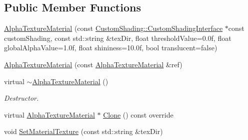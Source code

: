 \subsection*{Public Member Functions}
\begin{DoxyCompactItemize}
\item 
\mbox{\hyperlink{class_geometry_engine_1_1_geometry_material_1_1_alpha_texture_material_a13e251b89fd08e38647572695196c5b6}{Alpha\+Texture\+Material}} (const \mbox{\hyperlink{class_geometry_engine_1_1_custom_shading_1_1_custom_shading_interface}{Custom\+Shading\+::\+Custom\+Shading\+Interface}} $\ast$const custom\+Shading, const std\+::string \&tex\+Dir, float threshold\+Value=0.\+0f, float global\+Alpha\+Value=1.\+0f, float shininess=10.\+0f, bool translucent=false)
\item 
\mbox{\hyperlink{class_geometry_engine_1_1_geometry_material_1_1_alpha_texture_material_a3ba50a82f2bacaba7c0c66e032e9452b}{Alpha\+Texture\+Material}} (const \mbox{\hyperlink{class_geometry_engine_1_1_geometry_material_1_1_alpha_texture_material}{Alpha\+Texture\+Material}} \&ref)
\item 
\mbox{\label{class_geometry_engine_1_1_geometry_material_1_1_alpha_texture_material_afc7f6aceb25713feaddf391b110e79a3}} 
virtual \mbox{\hyperlink{class_geometry_engine_1_1_geometry_material_1_1_alpha_texture_material_afc7f6aceb25713feaddf391b110e79a3}{$\sim$\+Alpha\+Texture\+Material}} ()
\begin{DoxyCompactList}\small\item\em Destructor. \end{DoxyCompactList}\item 
virtual \mbox{\hyperlink{class_geometry_engine_1_1_geometry_material_1_1_alpha_texture_material}{Alpha\+Texture\+Material}} $\ast$ \mbox{\hyperlink{class_geometry_engine_1_1_geometry_material_1_1_alpha_texture_material_a27375f0008fcdeaacb49fb4266f9f480}{Clone}} () const override
\item 
void \mbox{\hyperlink{class_geometry_engine_1_1_geometry_material_1_1_alpha_texture_material_a8f151748d894f89722bf6515a832aa8d}{Set\+Material\+Texture}} (const std\+::string \&tex\+Dir)
\item 
\mbox{\label{class_geometry_engine_1_1_geometry_material_1_1_alpha_texture_material_af2339e0ddb95a9b39cfce856d218819c}} 

\end{DoxyCompactItemize}
